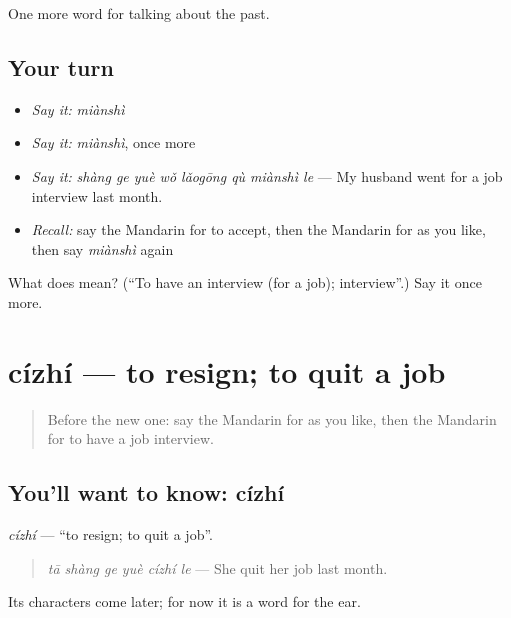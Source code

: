 \begin{grammarlens}[title={What you've built}]
One more word for talking about the past.
\end{grammarlens}

\subsection*{Your turn}
\begin{itemize}
\raggedright
  \item \emph{Say it:} \emph{miànshì}
  \item \emph{Say it:} \emph{miànshì}, once more
  \item \emph{Say it:} \emph{shàng ge yuè wǒ lǎogōng qù miànshì le} — My husband went for a job interview last month.
  \item \emph{Recall:} say the Mandarin for to accept, then the Mandarin for as you like, then say \emph{miànshì} again
\end{itemize}

\begin{tcolorbox}[breakable,colback=teal!4,colframe=teal!35!black,title={Before you move on}]
What does  mean? (\textquotedblleft{}To have an interview (for a job); interview\textquotedblright{}.) Say it once more.
\end{tcolorbox}
\section[cízhí]{cízhí — to resign; to quit a job}

\label{lesson:ZH-C276-cizhi}



\begin{quote}
Before the new one: say the Mandarin for as you like, then the Mandarin for to have a job interview.
\end{quote}

\subsection*{You'll want to know: cízhí}
\emph{cízhí} — \textquotedblleft{}to resign; to quit a job\textquotedblright{}.

\begin{quote}
\emph{tā shàng ge yuè cízhí le} — She quit her job last month.
\end{quote}

Its characters come later; for now it is a word for the ear.

